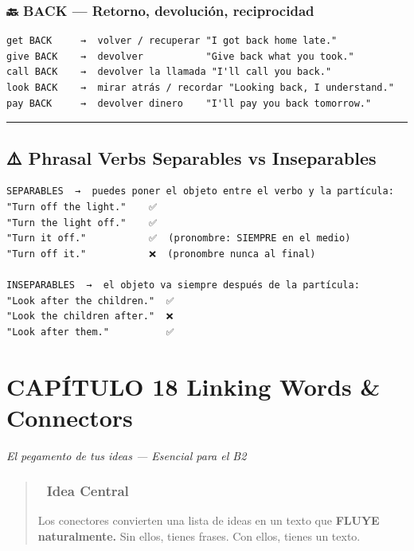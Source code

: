 \documentclass[
  spanish,
  letterpaper,
]{scrbook}
\begin{document}
\subsection{🔙 BACK --- Retorno, devolución,
reciprocidad}\label{back-retorno-devoluciuxf3n-reciprocidad}

\begin{verbatim}
get BACK     →  volver / recuperar "I got back home late."
give BACK    →  devolver           "Give back what you took."
call BACK    →  devolver la llamada "I'll call you back."
look BACK    →  mirar atrás / recordar "Looking back, I understand."
pay BACK     →  devolver dinero    "I'll pay you back tomorrow."
\end{verbatim}

\begin{center}\rule{0.5\linewidth}{0.5pt}\end{center}

\section{⚠️ Phrasal Verbs Separables vs
Inseparables}\label{phrasal-verbs-separables-vs-inseparables}

\begin{verbatim}
SEPARABLES  →  puedes poner el objeto entre el verbo y la partícula:
"Turn off the light."    ✅
"Turn the light off."    ✅
"Turn it off."           ✅  (pronombre: SIEMPRE en el medio)
"Turn off it."           ❌  (pronombre nunca al final)

INSEPARABLES  →  el objeto va siempre después de la partícula:
"Look after the children."  ✅
"Look the children after."  ❌
"Look after them."          ✅
\end{verbatim}

\chapter{CAPÍTULO 18 Linking Words \&
Connectors}\label{capuxedtulo-18-linking-words-connectors}

\emph{El pegamento de tus ideas --- Esencial para el B2}

\begin{quote}
\subsection{🎯 Idea Central}\label{idea-central-16}

Los conectores convierten una lista de ideas en un texto que
\textbf{FLUYE naturalmente.} Sin ellos, tienes frases. Con ellos, tienes
un texto.
\end{quote}
\end{document}
